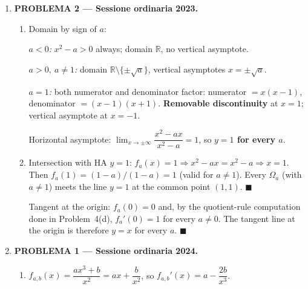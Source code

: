 \documentclass[12pt, twoside]{article}
\begin{document}
\begin{enumerate}[itemsep=0.3cm]
\begin{enumerate}[label=(\alph*), itemsep=0.2cm]
  \item Right branch ($x>0$): from $+\infty$ at $0^+$ down to local minimum
  $(2,3)$, then up toward $y=x$ from above.

  Left branch ($x<0$): monotonically increasing from $-\infty$ along $y=x$
  (from above), through $(-\sqrt[3]{4},0)\approx(-1.59,0)$, up to $+\infty$
  at $0^-$.
\end{enumerate}

\item \textbf{PROBLEMA 2 --- Sessione ordinaria 2023.}

\begin{enumerate}[label=(\alph*), itemsep=0.3cm]
  \item Domain by sign of $a$:

  \quad \emph{$a<0$:} $x^2-a>0$ always; domain $\mathbb R$, no vertical
  asymptote.

  \quad \emph{$a>0,\ a\ne 1$:} domain $\mathbb R\setminus\{\pm\sqrt a\}$,
  vertical asymptotes $x=\pm\sqrt a$.

  \quad \emph{$a=1$:} both numerator and denominator factor: numerator
  $=x(x-1)$, denominator $=(x-1)(x+1)$. \textbf{Removable discontinuity}
  at $x=1$; vertical asymptote at $x=-1$.

  Horizontal asymptote: $\lim_{x\to\pm\infty}\dfrac{x^2-ax}{x^2-a}=1$, so
  \textbf{$y=1$ for every $a$}.

\newpage

  \item Intersection with HA $y=1$: $f_a(x)=1\Rightarrow x^2-ax=x^2-a
  \Rightarrow x=1$. Then $f_a(1)=(1-a)/(1-a)=1$ (valid for $a\ne 1$).
  Every $\Omega_a$ (with $a\ne 1$) meets the line $y=1$ at the common
  point $(1,1)$. \hfill $\blacksquare$

  Tangent at the origin: $f_a(0)=0$ and, by the quotient-rule computation
  done in Problem~4(d), $f_a'(0)=1$ for every $a\ne 0$. The tangent line
  at the origin is therefore $y=x$ for every $a$. \hfill $\blacksquare$
\end{enumerate}

\medskip

\item \textbf{PROBLEMA 1 --- Sessione ordinaria 2024.}

\begin{enumerate}[label=(\alph*), itemsep=0.3cm]
  \item $f_{a,b}(x)=\dfrac{ax^3+b}{x^2}=ax+\dfrac{b}{x^2}$, so
  $f_{a,b}'(x)=a-\dfrac{2b}{x^3}$.


\end{enumerate}
\end{enumerate}
\end{document}
